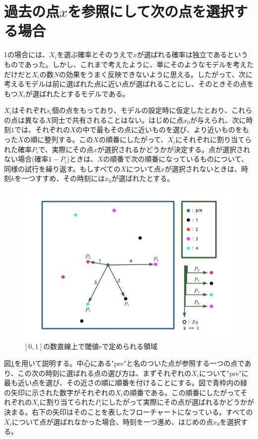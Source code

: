 \section{過去の点$x$を参照にして次の点を選択する場合}

1の場合には、$X_{i}$を選ぶ確率とそのうえで$x$が選ばれる確率は独立であるというものであった。しかし、これまで考えたように、単にそのようなモデルを考えただけだと$X_{i}$の数$N$の効果をうまく反映できないように思える。したがって、次に考えるモデルは前に選ばれた点に近い点が選ばれることにし、そのときその点をもつ$X_{i}$が選ばれたとするモデルである。

$X_{i}$はそれぞれ$s_{i}$個の点をもっており、モデルの設定時に仮定したとおり、これらの点は異なる$X$同士で共有されることはない。はじめに点$x_{0}$が与えられ、次に時刻$1$では、それぞれの$X$の中で最もその点に近いものを選び、より近いものをもった$X$の順に整列する。この$X$の順番にしたがって、$X_{i}$にそれぞれに割り当てられた確率$P_{i}$で、実際にその点$x$が選択されるかどうかが決定する。点が選択されない場合(確率$1-P_{i}$)ときは、$X$の順番で次の順番になっているものについて、同様の試行を繰り返す。もしすべての$X$について点$x$が選択されないときは、時刻$k$を一つすすめ、その時刻には$x_{0}$が選ばれたとする。
\begin{figure}[H]
    \begin{center}
        \includegraphics[width=12.5cm]{../img/figure2.jpg}
        \caption{$[0,1]$の数直線上で閾値$r$で定められる領域}
        \label{fig:f8}
    \end{center}
\end{figure}

図\ref{fig:f8}を用いて説明する。中心にある"pre"と名のついた点が参照する一つの点であり、この次の時刻に選ばれる点の選び方は、まずそれぞれの$X_{i}$について"pre"に最も近い点を選び、その近さの順に順番を付けることにする。図で青枠内の緑の矢印に示された数字がそれぞれの$X_{i}$の順番である。この順番にしたがってそれぞれの$X_{i}$に割り当てられた$P_{i}$にしたがって実際にその点が選ばれるかどうかが決まる。右下の矢印はそのことを表したフローチャートになっている。すべての$X_{i}$について点が選ばれなかった場合、時刻を一つ進め、はじめの点$x_{0}$を選択する。

